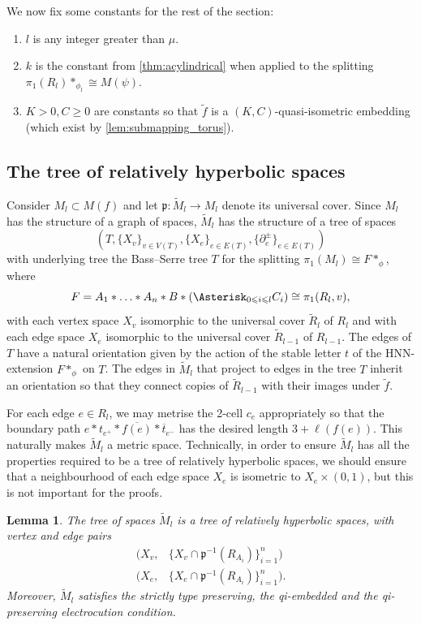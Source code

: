 \documentclass[11pt, a4paper]{amsart}
\newtheorem{lemma}[theorem]{Lemma}
\theoremstyle{definition}
\newcommand{\wt}[1]{\widetilde{ #1 }}
\DeclareMathOperator{\len}{\ell}
\begin{document}
We now fix some constants for the rest of the section:
\begin{enumerate}
\item $l$ is any integer greater than $\mu$.
\item $k$ is the constant from \cref{thm:acylindrical} when applied to the splitting $\pi_1(R_{l})*_{\phi_l}\cong M(\psi)$.
\item $K>0, C\geqslant 0$ are constants so that $\wt{f}$ is a $(K, C)$-quasi-isometric embedding (which exist by \cref{lem:submapping_torus}).
\end{enumerate}



\subsection{The tree of relatively hyperbolic spaces}

Consider $M_{l}\subset M(f)$ and let $\mathfrak{p}\colon\widetilde{M}_{l}\to M_{l}$ denote its universal cover. Since $M_{l}$ has the structure of a graph of spaces, $\widetilde{M}_{l}$ has the structure of a tree of spaces
\[
(T, \{X_v\}_{v\in V(T)}, \{X_e\}_{e\in E(T)}, \{\partial_e^{\pm}\}_{e\in E(T)})
\]
 with underlying tree the Bass--Serre tree $T$ for the splitting $\pi_1(M_l)\cong F*_{\phi}$, where
\[
F = A_1*\ldots *A_n*B*\left(\Asterisk_{0\leqslant i\leqslant l}C_i\right) \cong \pi_1(R_{l}, v),
\]
with each vertex space $X_v$ isomorphic to the universal cover $\widetilde{R}_{l}$ of $R_{l}$ and with each edge space $X_e$ isomorphic to the universal cover $\widetilde{R}_{l-1}$ of $R_{l-1}$. The edges of $T$ have a natural orientation given by the action of the stable letter $t$ of the HNN-extension $F*_{\phi}$ on $T$. The edges in $\widetilde{M}_{l}$ that project to edges in the tree $T$ inherit an orientation so that they connect copies of $\widetilde{R}_{l-1}$ with their images under $\widetilde{f}$.

For each edge $e\in R_{l}$, we may metrise the 2-cell $c_e$ appropriately so that the boundary path $e*t_{e^+}*\overline{f(e)}*\overline{t}_{e^-}$ has the desired length $3 + \len(f(e))$. This naturally makes $\wt{M}_l$ a metric space. Technically, in order to ensure $\wt{M}_l$ has all the properties required to be a tree of relatively hyperbolic spaces, we should ensure that a neighbourhood of each edge space $X_e$ is isometric to $X_e\times(0, 1)$, but this is not important for the proofs.


\begin{lemma}
\label{lem:conditions}
The tree of spaces $\widetilde{M}_{l}$ is a tree of relatively hyperbolic spaces, with vertex and edge pairs
\begin{align*}
(X_v, &\{X_v\cap \mathfrak{p}^{-1}(R_{A_i})\}_{i=1}^n)\\
(X_e, &\{X_e\cap \mathfrak{p}^{-1}(R_{A_i})\}_{i=1}^n).
\end{align*}
Moreover, $\wt{M}_l$ satisfies the strictly type preserving, the qi-embedded and the qi-preserving electrocution condition.
\end{lemma}
\end{document}
